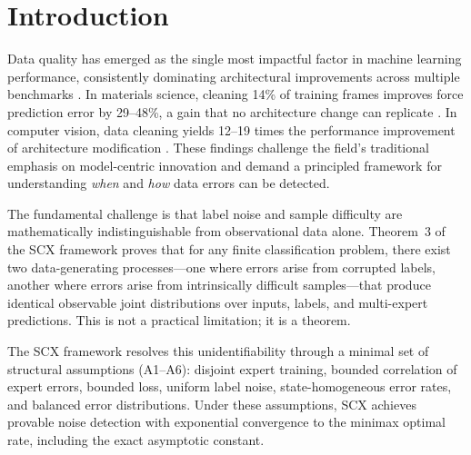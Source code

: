 \documentclass[twocolumn]{article}
\theoremstyle{definition}
\begin{document}
\section{Introduction}

Data quality has emerged as the single most impactful factor in machine learning performance, consistently dominating architectural improvements across multiple benchmarks \cite{paperIII, northcutt2021}. In materials science, cleaning 14\% of training frames improves force prediction error by 29--48\%, a gain that no architecture change can replicate \cite{paperIV}. In computer vision, data cleaning yields 12--19 times the performance improvement of architecture modification \cite{paperIII}. These findings challenge the field's traditional emphasis on model-centric innovation and demand a principled framework for understanding \emph{when} and \emph{how} data errors can be detected.

The fundamental challenge is that label noise and sample difficulty are mathematically indistinguishable from observational data alone. Theorem~3 of the SCX framework proves that for any finite classification problem, there exist two data-generating processes---one where errors arise from corrupted labels, another where errors arise from intrinsically difficult samples---that produce identical observable joint distributions over inputs, labels, and multi-expert predictions. This is not a practical limitation; it is a theorem.

The SCX framework resolves this unidentifiability through a minimal set of structural assumptions (A1--A6): disjoint expert training, bounded correlation of expert errors, bounded loss, uniform label noise, state-homogeneous error rates, and balanced error distributions. Under these assumptions, SCX achieves provable noise detection with exponential convergence to the minimax optimal rate, including the exact asymptotic constant.
\end{document}
